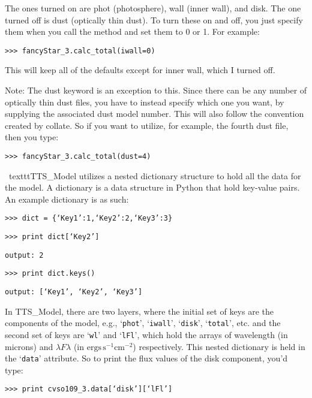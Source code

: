 \documentclass{emulateapj}
\begin{document}
\noindent The ones turned on are phot (photosphere), wall (inner wall), and disk. The one turned off is dust (optically thin dust). To turn these on and off, you just specify them when you call the method and set them to 0 or 1. For example: 

\vspace{2mm}
\texttt{>>> fancyStar\_3.calc\_total(iwall=0)}
\vspace{2mm}
 
This will keep all of the defaults except for inner wall, which I turned off. 
 
Note: The dust keyword is an exception to this. Since there can be any number of optically thin dust files, you have to instead specify which one you want, by supplying the associated dust model number. This will also follow the convention created by collate. So if you want to utilize, for example, the fourth dust file, then you type: 

\vspace{2mm}
\texttt{>>> fancyStar\_3.calc\_total(dust=4)}
\vspace{2mm}
 
\
texttt{TTS\_Model} utilizes a nested dictionary structure to hold all the data for the model. A dictionary is a data structure in Python that hold key-value pairs. An example dictionary is as such: 
 
\vspace{2mm}
\texttt{>>> dict = \{‘Key1’:1,‘Key2’:2,‘Key3’:3\}}

\texttt{>>> print dict[‘Key2’]}

\texttt{output: 2 }

\texttt{>>> print dict.keys() }

\texttt{output: [‘Key1’, ‘Key2’, ‘Key3’] }
\vspace{2mm}
 
In TTS\_Model, there are two layers, where the initial set of keys are the components of the model, e.g., `\texttt{phot}', `\texttt{iwall}', `\texttt{disk}', `\texttt{total}', etc. and the second set of keys are `\texttt{wl}' and `\texttt{lFl}’, which hold the arrays of wavelength (in microns) and $\lambda F\lambda $ (in $\mbox{ergs}\, \mbox{s}^{-1} \mbox{cm}^{-2}$) respectively. This nested dictionary is held in the ‘\texttt{data}’ attribute. So to print the flux values of the disk component, you’d type: 
 
\vspace{2mm}
\texttt{>>> print cvso109\_3.data[‘disk’][‘lFl’]}
\vspace{2mm}
\end{document}
